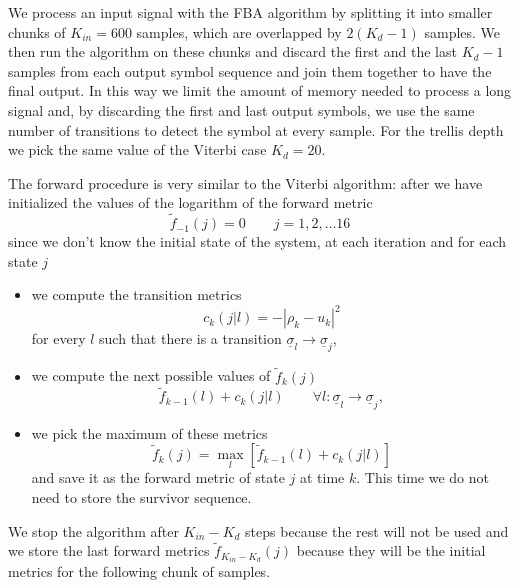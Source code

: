 \documentclass[a4paper,oneside]{article}
\renewcommand{\vec}[1]{\underline{#1}}
\newcommand{\abs}[1]{\left|#1\right|}
\newcommand{\vsigma}[0]{\vec{\sigma}}
\begin{document}
We process an input signal with the FBA algorithm by splitting it into
smaller chunks of $K_{in} = 600$ samples, which are overlapped by
$2(K_d-1)$ samples. We then run the algorithm on these chunks and
discard the first and the last $K_d-1$ samples from each output symbol
sequence and join them together to have the final output.  In this way
we limit the amount of memory needed to process a long signal and, by
discarding the first and last output symbols, we use the same number
of transitions to detect the symbol at every sample.  For the trellis
depth we pick the same value of the Viterbi case $K_d = 20$.

The forward procedure is very similar to the Viterbi algorithm: after
we have initialized the values of the logarithm of the forward metric
\begin{equation}
  \tilde{f}_{-1}(j) = 0 \qquad j=1,2,\dots 16
\end{equation}
since we don't know the initial state of the system, at each iteration
and for each state $j$
\begin{itemize}
  \item we compute the transition metrics
    \begin{equation}
      c_k(j|l) = -\abs{\rho_k - u_k}^2
    \end{equation}
    for every $l$ such that there is a transition $\vsigma_l
    \rightarrow \vsigma_j$,
  \item we compute the next possible values of $\tilde{f}_k(j)$
    \begin{equation}
      \tilde{f}_{k-1}(l) + c_k(j|l) \qquad \forall l : \vsigma_l
      \rightarrow \vsigma_j ,
    \end{equation}
  \item we pick the maximum of these metrics
    \begin{equation}
       \tilde{f}_{k}(j)  = \max_{l} \left[ \tilde{f}_{k-1}(l) + c_k(j|l) \right] 
    \end{equation}
    and save it as the forward metric of state $j$ at time $k$. This
    time we do not need to store the survivor sequence.
\end{itemize}
We stop the algorithm after $K_{in} - K_d$ steps because the rest will
not be used and we store the last forward metrics $\tilde{f}_{K_{in} -
  K_d}(j)$ because they will be the initial metrics for the following
chunk of samples.
\end{document}
